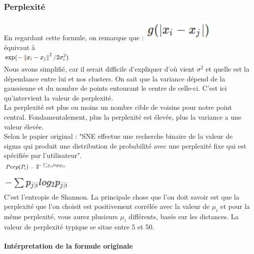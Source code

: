 \subsubsection*{Perplexité}
En regardant cette formule, on remarque que :
\includegraphics[width=100pt]{./img/reduction_dim/t_sne/eq_prob_4.png}
\\
équivaut à 
\\
\includegraphics[width=100pt]{./img/reduction_dim/t_sne/eq_prob_5.png}
\\
Nous avons simplifié, car il serait difficile d'expliquer d'où vient $\sigma^2$ et quelle est la dépendance entre lui et nos clusters. On sait que la variance dépend de la gaussienne et du nombre de points entourant le centre de celle-ci. C'est ici qu'intervient la valeur de perplexité.
\\
La perplexité est plus ou moins un nombre cible de voisins pour notre point central. Fondamentalement, plus la perplexité est élevée, plus la variance a une valeur élevée. 
\\
Selon le papier original : "SNE effectue une recherche binaire de la valeur de sigma qui produit une distribution de probabilité avec une perplexité fixe qui est spécifiée par l'utilisateur".
\\
\includegraphics[width=100pt]{./img/reduction_dim/t_sne/eq_prob_6.png}
\\
\includegraphics[width=100pt]{./img/reduction_dim/t_sne/eq_prob_7.png}
\\
C'est l'entropie de Shannon. La principale chose que l'on doit savoir est que la perplexité que l'on choisit est positivement corrélée avec la valeur de $\mu_i$ et pour la même perplexité, vous aurez plusieurs $\mu_i$ différents, basés sur les distances. La valeur de perplexité typique se situe entre 5 et 50.
\\
\\
\textbf{Intérpretation de la formule originale}
\\
